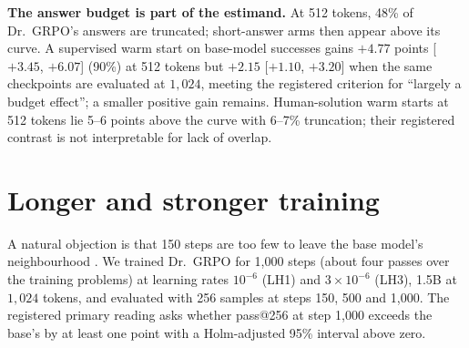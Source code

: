 \documentclass{article}
\theoremstyle{plain}
\begin{document}
\textbf{The answer budget is part of the estimand.} At 512 tokens, 48\% of Dr.\ GRPO's answers are truncated; short-answer arms then appear above its curve. A supervised warm start on base-model successes gains $+4.77$ points [$+3.45$, $+6.07$] (90\%) at 512 tokens but $+2.15$ [$+1.10$, $+3.20$] when the same checkpoints are evaluated at $1{,}024$, meeting the registered criterion for ``largely a budget effect''; a smaller positive gain remains. Human-solution warm starts at 512 tokens lie 5--6 points above the curve with 6--7\% truncation; their registered contrast is not interpretable for lack of overlap.

\section{Longer and stronger training}\label{sec:long}
A natural objection is that 150 steps are too few to leave the base model's neighbourhood \citep{liu2025prorl}. We trained Dr.\ GRPO for 1,000 steps (about four passes over the training problems) at learning rates $10^{-6}$ (LH1) and $3\times10^{-6}$ (LH3), 1.5B at $1{,}024$ tokens, and evaluated with 256 samples at steps 150, 500 and 1,000. The registered primary reading asks whether pass@256 at step 1,000 exceeds the base's by at least one point with a Holm-adjusted 95\% interval above zero.

\begin{table}[t]
\caption{Longer training (1.5B, 1,024 tokens). pass@256 from 256 samples; the base's pass@256 is $94.91$. Law residual: pass@16 minus the frozen law at the checkpoint's pass@1.}
\label{tab:long}
\centering\small
{}
\end{table}
\end{document}
